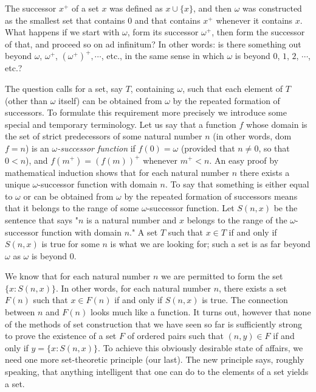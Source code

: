 
The successor $x^{+}$ of a set $x$ was defined as $x \cup \{ x \} $, and then $\omega$ was constructed as the smallest set that contains $0$ and that contains $x^{+}$ whenever it contains $x$. What happens if we start with $\omega$, form its successor $\omega^{+}$, then form the successor of that, and proceed so on ad infinitum? In other words: is there something out beyond $\omega$, $\omega^{+}$, $(\omega^{+})^{+}, \cdots$, etc., in the same sense in which $\omega$ is beyond $0$, $1$, $2$, $\cdots$, etc.? 

The question calls for a set, say $T$, containing $\omega$, such that each element of $T$ (other than $\omega$ itself) can be obtained from $\omega$ by the repeated formation of successors. To formulate this requirement more precisely we introduce some special and temporary terminology. Let us say that a function $f$ whose domain is the set of strict predecessors of some natural number $n$  (in other words, dom $f = n$) is an \textit{$\omega$-successor function} if $f(0) = \omega$ (provided that $n \neq 0$, so that $0 < n$), and $f(m^{+}) = (f(m))^{+}$ whenever $m^{+} < n$. An easy proof by mathematical induction shows that for each natural number $n$ there exists a unique $\omega$-successor function with domain $n$. To say that something is either equal to $\omega$ or can be obtained from $\omega$ by the repeated formation of successors means that it belongs to the range of some $\omega$-successor function. Let $S(n,x)$ be the sentence that says "$n$ is a natural number and $x$ belongs to the range of the $\omega$-successor function with domain $n$." A set $T$ such that $x \in T$ if and only if $S(n,x)$ is true for some $n$ is what we are looking for; such a set is as far beyond $\omega$ as $\omega$ is beyond $0$. 

We know that for each natural number $n$ we are permitted to form the set $\{ x: S(n,x) \}$. In other words, for each natural number $n$, there exists a set $F(n)$ such that $x \in F(n)$ if and only if $S(n,x)$ is true. The connection between $n$ and $F(n)$ looks much like a function. It turns out, however that none of the methods of set construction that we have seen so far is sufficiently strong to prove the existence of a set $F$ of ordered pairs such that $(n, y) \in F$ if and only if $y = \{ x: S(n,x) \}$. To achieve this obviously desirable state of affairs, we need one more set-theoretic principle (our last). The new principle says, roughly speaking, that anything intelligent that one can do to the elements of a set yields a set.

